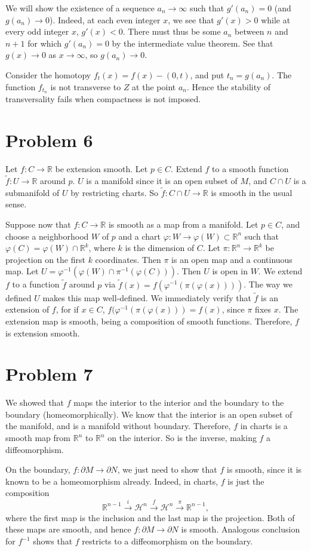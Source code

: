 \documentclass{amsart}
\numberwithin{equation}{section}
\theoremstyle{plain}
\theoremstyle{definition}
\theoremstyle{remark}
\renewcommand{\H}{\mathbb{H}}
\renewcommand{\_}[2]{\underbrace{#1}_{#2}}
\renewcommand{\^}[2]{\overbrace{#1}_{#2}}
\newcommand{\R}{\mathbb{R}}
\renewcommand{\H}{\mathcal{H}}
\begin{document}
We will show the existence of a sequence $a_n \to \infty$ such that $g'(a_n) = 0$ (and $g(a_n) \to 0$). Indeed, at each even integer $x$, we see that $g'(x)>0$ while at every odd integer $x$, $g'(x)<0$. There must thus be some $a_n$ between $n$ and $n+1$ for which $g'(a_n) = 0$ by the intermediate value theorem. See that $g(x) \to 0$ as $x \to \infty$, so $g(a_n) \to 0$. 

Consider the homotopy $f_t(x) = f(x) - (0,t)$, and put $t_n = g(a_n)$. The function $f_{t_n}$ is not transverse to $Z$ at the point $a_n$. Hence the stability of transversality fails when compactness is not imposed.
\section*{Problem 6}

Let $f:C\to \R$ be extension smooth. Let $p \in C$. Extend $f$ to a smooth function $\tilde f: U\to \R$ around $p$. $U$ is a manifold since it is an open subset of $M$, and $C\cap U$ is a submanifold of $U$ by restricting charts. So $\tilde f: C\cap U \to \R$ is smooth in the usual sense. 

Suppose now that $f:C\to \R$ is smooth as a map from a manifold. Let $p\in C$, and choose a neighborhood $W$ of $p$ and a chart $\varphi: W\to \varphi(W) \subset \R^n$ such that $\varphi(C) = \varphi(W) \cap \R^k$, where $k$ is the dimension of $C$. Let $\pi: \R^n \to \R^k$ be projection on the first $k$ coordinates. Then $\pi$ is an open map and a continuous map. Let $U = \varphi^{-1}(\varphi(W) \cap \pi^{-1}(\varphi(C)))$. Then $U$ is open in $W$. We extend $f$ to a function $\tilde f$ around $p$ via $\tilde f(x) = f(\varphi^{-1}(\pi(\varphi(x))))$. The way we defined $U$ makes this map well-defined. We immediately verify that $\tilde f$ is an extension of $f$, for if $x\in C$, $f(\varphi^{-1}(\pi(\varphi(x))) = f(x)$, since $\pi$ fixes $x$. The extension map is smooth, being a composition of smooth functions. Therefore, $f$ is extension smooth.

\section*{Problem 7}
We showed that $f$ maps the interior to the interior and the boundary to the boundary (homeomorphically). We know that the interior is an open subset of the manifold, and is a manifold without boundary. Therefore, $f$ in charts is a smooth map from $\R^n$ to $\R^n$ on the interior. So is the inverse, making $f$ a diffeomorphism.

On the boundary, $f: \partial M \to \partial N$, we just need to show that $f$ is smooth, since it is known to be a homeomorphism already. Indeed, in charts, $f$ is just the composition \[\R^{n-1} \stackrel{i}\to \H^n \stackrel{f}{\to} \H^n \stackrel{\pi}\to \R^{n-1},\] where the first map is the inclusion and the last map is the projection. Both of these maps are smooth, and hence $f:\partial M \to \partial N$ is smooth. Analogous conclusion for $f^{-1}$ shows that $f$ restricts to a diffeomorphism on the boundary.
\end{document}
